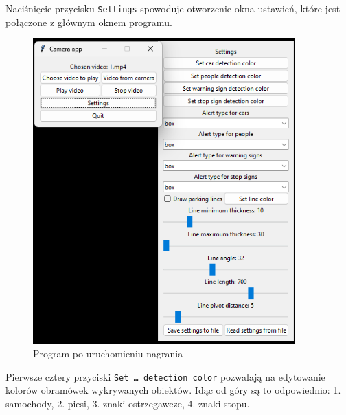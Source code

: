 \newpage

Naciśnięcie przycisku \verb|Settings| spowoduje otworzenie okna ustawień, które jest połączone z głównym oknem programu.

\begin{figure}[H]
	\centering
	\includegraphics[width=0.9\textwidth]{Img/manual/settings_opened.png}
	\caption{Program po uruchomieniu nagrania}
	\label{fig:settings_opened}
\end{figure}

\newpage

Pierwsze cztery przyciski \verb|Set … detection color| pozwalają na edytowanie kolorów obramówek wykrywanych obiektów.
Idąc od góry są to odpowiednio: 1. samochody, 2. piesi, 3. znaki ostrzegawcze, 4. znaki stopu.

